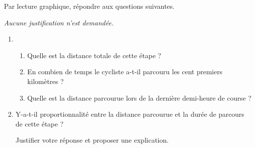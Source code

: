 Par lecture graphique, répondre aux questions suivantes.

\emph{Aucune justification n'est demandée.}

\medskip

\begin{enumerate}
\item 
	\begin{enumerate}
		\item Quelle est la distance totale de cette étape ?
		\item En combien de temps le cycliste a-t-il parcouru les cent premiers kilomètres ?
		\item Quelle est la distance parcourue lors de la dernière demi-heure de course ?
	\end{enumerate}
\item  Y-a-t-il proportionnalité entre la distance parcourue et la durée de parcours de cette
étape ?
	
Justifier votre réponse et proposer une explication.
\end{enumerate}
